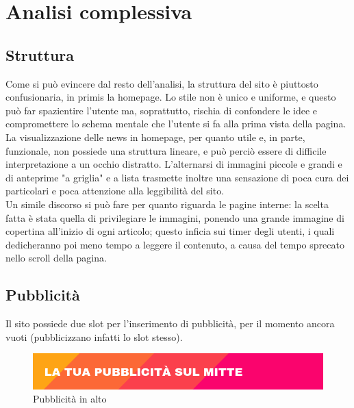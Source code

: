 \newpage
\section{Analisi complessiva}

\subsection{Struttura}
Come si può evincere dal resto dell'analisi, la struttura del sito è piuttosto confusionaria, in primis la homepage. Lo stile non è unico e uniforme, e questo può far spazientire l'utente ma, soprattutto, rischia di confondere le idee e compromettere lo schema mentale che l'utente si fa alla prima vista della pagina. \\
La visualizzazione delle news in homepage, per quanto utile e, in parte, funzionale, non possiede una struttura lineare, e può perciò essere di difficile interpretazione a un occhio distratto. L'alternarsi di immagini piccole e grandi e di anteprime "a griglia" e a lista trasmette inoltre una sensazione di poca cura dei particolari e poca attenzione alla leggibilità del sito. \\
Un simile discorso si può fare per quanto riguarda le pagine interne: la scelta fatta è stata quella di privilegiare le immagini, ponendo una grande immagine di copertina all'inizio di ogni articolo; questo inficia sui timer degli utenti, i quali dedicheranno poi meno tempo a leggere il contenuto, a causa del tempo sprecato nello scroll della pagina.

\subsection{Pubblicità}
Il sito possiede due slot per l'inserimento di pubblicità, per il momento ancora vuoti (pubblicizzano infatti lo slot stesso).

\vspace{30pt}
\begin{figure}[htbp]
\begin{center}
\includegraphics[width=35em]{img/pubblicita1}
\caption{Pubblicità in alto}
\end{center}
\end{figure}
\vspace{30pt}

